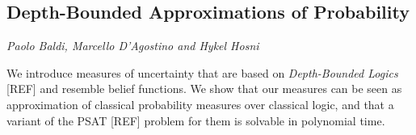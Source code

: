\documentclass[../booklet.tex]{subfiles}
\begin{document}
\subsection[Depth-Bounded Approximations of Probability. {\it Paolo Baldi, Marcello D'Agostino and Hykel Hosni}]{Depth-Bounded Approximations of Probability}
  

\begin{center}
  {\it Paolo Baldi, Marcello D'Agostino and Hykel Hosni}
\end{center}



We introduce measures of uncertainty that are based on {\em Depth-Bounded Logics} [REF] and resemble belief functions. We show that our measures can be seen as approximation of classical probability measures over classical logic, and that 
a variant of the PSAT [REF] problem for them is solvable in polynomial time. 

\end{document}
